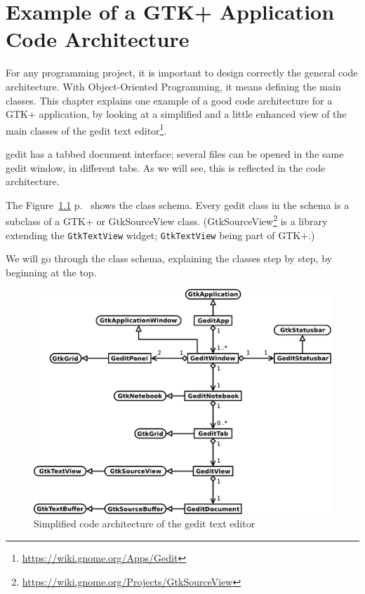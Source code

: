 \chapter{Example of a GTK+ Application Code Architecture}
\label{gtk-app-arch}

For any programming project, it is important to design correctly the general code architecture. With Object-Oriented Programming, it means defining the main classes. This chapter explains one example of a good code architecture for a GTK+ application, by looking at a simplified and a little enhanced view of the main classes of the gedit text editor\footnote{\url{https://wiki.gnome.org/Apps/Gedit}}.

gedit has a tabbed document interface; several files can be opened in the same gedit window, in different tabs. As we will see, this is reflected in the code architecture.

The Figure~\ref{fig:gedit-architecture} p.~\pageref{fig:gedit-architecture} shows the class schema. Every gedit class in the schema is a subclass of a GTK+ or GtkSourceView class. (GtkSourceView\footnote{\url{https://wiki.gnome.org/Projects/GtkSourceView}} is a library extending the \lstinline{GtkTextView} widget; \lstinline{GtkTextView} being part of GTK+.)

We will go through the class schema, explaining the classes step by step, by beginning at the top.

\begin{figure}
  \begin{center}
    \includegraphics[width=\textwidth]{images/gedit-architecture.pdf}
    \caption{Simplified code architecture of the gedit text editor}
    \label{fig:gedit-architecture}
  \end{center}
\end{figure}

